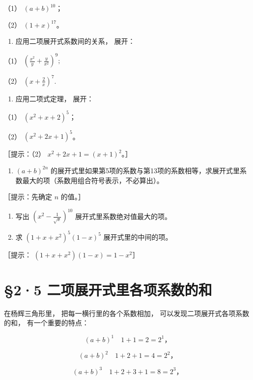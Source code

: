 （1） \((a + b)^{10}\)；

（2） \((1 + x)^{17}\)。

\begin{enumerate}[start=2]
\item
  应用二项展开式系数间的关系， 展开：
\end{enumerate}

（1） \(\left(\frac{x^2}{y} + \frac{y}{x^2}\right)^9;\)

（2） \(\left(x + \frac{2}{x}\right)^7.\)

\begin{enumerate}[start=3]
\item
  应用二项式定理， 展开：
\end{enumerate}

（1） \((x^{2} + x + 2)^{5}\)；

（2） \((x^{2} + 2x + 1)^{5}\)。

［提示：（2） \(x^{2} + 2x + 1 = (x + 1)^{2}\)。］

\begin{enumerate}[start=4]
\item
  \((a + b)^{2n}\)
  的展开式里如果第5项的系数与第13项的系数相等，求展开式里系数最大的项（系数用组合符号表示，不必算出）。
\end{enumerate}

［提示：先确定 \(n\) 的值。］

\begin{enumerate}[start=5]
\item
  写出 \(\left(x^{2} - \frac{1}{\sqrt{x}}\right)^{10}\)
  展开式里系数绝对值最大的项。
\item
  求 \((1 + x + x^2)^5 (1 - x)^5\) 展开式里的中间的项。
\end{enumerate}

［提示： \((1 + x + x^{2})(1 - x) = 1 - x^{2}\)］

\section{§2·5 二项展开式里各项系数的和}

在杨辉三角形里， 把每一横行里的各个系数相加，
可以发现二项展开式各项系数的和， 有一个重要的特点：

\[
(a + b) ^ {1} \quad 1 + 1 = 2 = 2 ^ {1}\text{，}
\]

\[
(a + b) ^ {2} \quad 1 + 2 + 1 = 4 = 2 ^ {2}\text{，}
\]

\[
(a + b) ^ {3} \quad 1 + 2 + 3 + 1 = 8 = 2 ^ {3}\text{，}
\]

